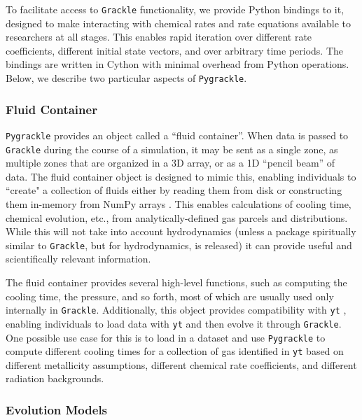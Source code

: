 To facilitate access to \texttt{Grackle} functionality, we provide Python bindings to
it, designed to make interacting with chemical rates and rate equations
available to researchers at all stages.  This enables rapid iteration over
different rate coefficients, different initial state vectors, and over
arbitrary time periods.  The bindings are written in Cython
\citep{behnel2010cython} with minimal overhead from Python operations.  Below,
we describe two particular aspects of \texttt{Pygrackle}.

\subsubsection{Fluid Container} \label{sec:pyfluid}

\texttt{Pygrackle} provides an object called a ``fluid container''.  When data is passed
to \texttt{Grackle} during the course of a simulation, it may be sent as a single zone,
as multiple zones that are organized in a 3D array, or as a 1D ``pencil beam'' of
data.  The fluid container object is designed to mimic this, enabling
individuals to ``create" a collection of fluids either by reading them from
disk or constructing them in-memory from NumPy arrays \citep{numpy}.  This
enables calculations of cooling time, chemical evolution, etc., from
analytically-defined gas parcels and distributions.  While this will not take
into account hydrodynamics (unless a package spiritually similar to \texttt{Grackle},
but for hydrodynamics, is released) it can provide useful and scientifically
relevant information.

The fluid container provides several high-level functions, such as computing
the cooling time, the pressure, and so forth, most of which are usually used
only internally in \texttt{Grackle}.  Additionally, this object provides compatibility
with \texttt{yt} \citep{2011ApJS..192....9T}, enabling individuals to load data
with \texttt{yt} and then evolve it through \texttt{Grackle}.  One possible use case for
this is to load in a dataset and use \texttt{Pygrackle} to compute different cooling
times for a collection of gas identified in \texttt{yt} based on different
metallicity assumptions, different chemical rate coefficients, and different
radiation backgrounds.

\subsubsection{Evolution Models} \label{sec:pyevolve}

